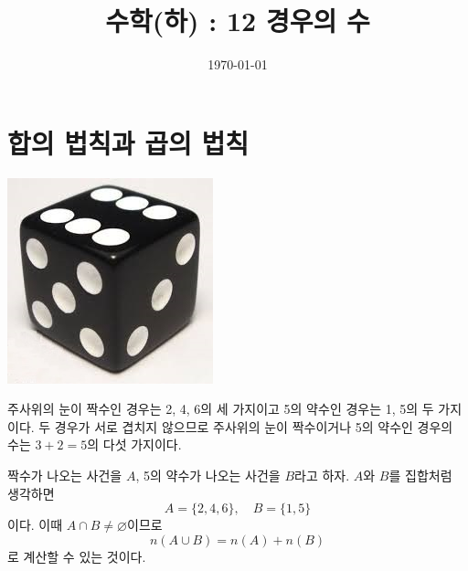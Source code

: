 \documentclass{oblivoir}
\begin{document}
\title{수학(하) : 12 경우의 수}
\author{}
\date{\today}
\maketitle
\tableofcontents
\newpage


\section{합의 법칙과 곱의 법칙}
\begin{minipage}{.8\textwidth}\label{law1}
%
\end{minipage}
\begin{minipage}{.2\textwidth}
\centering
\includegraphics[width=.5\textwidth]{dice1}
\end{minipage}
\begin{mdframed}
주사위의 눈이 짝수인 경우는 2, 4, 6의 세 가지이고
5의 약수인 경우는 1, 5의 두 가지이다.
두 경우가 서로 겹치지 않으므로 주사위의 눈이 짝수이거나 5의 약수인 경우의 수는 \(3+2=5\)의 다섯 가지이다.
\end{mdframed}

\bigskip
짝수가 나오는 사건을 \(A\), 5의 약수가 나오는 사건을 \(B\)라고 하자.
\(A\)와 \(B\)를 집합처럼 생각하면
\[A=\{2,4,6\},\quad B=\{1,5\}\]
이다.
이때 \(A\cap B\neq\varnothing\)이므로
\[n(A\cup B)=n(A)+n(B)\]
로 계산할 수 있는 것이다.


%
\end{document}
